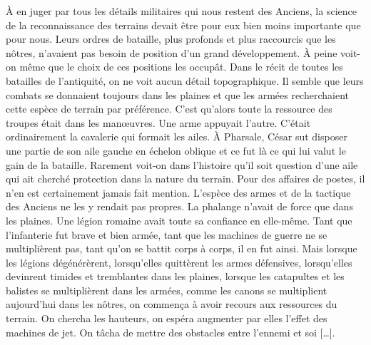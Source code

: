 \documentclass[french,twoside]{book} %
\begin{document}
\noindent À en juger par tous les détails militaires qui nous restent des Anciens, la science de la reconnaissance des terrains devait être pour eux bien moins importante que pour nous. Leurs ordres de bataille, plus profonds et plus raccourcis que les nôtres, n’avaient pas besoin de position d’un grand développement. À peine voit-on même que le choix de ces positions les occupât. Dans le récit de toutes les batailles de l’antiquité, on ne voit aucun détail topographique. Il semble que leurs combats se donnaient toujours dans les plaines et que les armées recherchaient cette espèce de terrain par préférence. C’est qu’alors toute la ressource des troupes était dans les manœuvres. Une arme appuyait l’autre. C’était ordinairement la cavalerie qui formait les ailes. À Pharsale, César sut disposer une partie de son aile gauche en échelon oblique et ce fut là ce qui lui valut le gain de la bataille. Rarement voit-on dans l’histoire qu’il soit question d’une aile qui ait cherché protection dans la nature du terrain. Pour des affaires de postes, il n’en est certainement jamais fait mention. L’espèce des armes et de la tactique des Anciens ne les y rendait pas propres. La phalange n’avait de force que dans les plaines. Une légion romaine avait toute sa confiance en elle-même. Tant que l’infanterie fut brave et bien armée, tant que les machines de guerre ne se multiplièrent pas, tant qu’on se battit corps à corps, il en fut ainsi. Mais lorsque les légions dégénérèrent, lorsqu’elles quittèrent les armes défensives, lorsqu’elles devinrent timides et tremblantes dans les plaines, lorsque les catapultes et les balistes se multiplièrent dans les armées, comme les canons se multiplient aujourd’hui dans les nôtres, on commença à avoir recours aux ressources du terrain. On chercha les hauteurs, on espéra augmenter par elles l’effet des machines de jet. On tâcha de mettre des obstacles entre l’ennemi et soi […].\par
\end{document}
